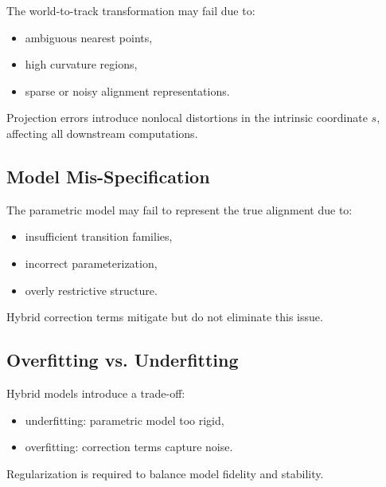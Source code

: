 The world-to-track transformation may fail due to:
\begin{itemize}
\item ambiguous nearest points,
\item high curvature regions,
\item sparse or noisy alignment representations.
\end{itemize}

\begin{proposition}
Projection errors introduce nonlocal distortions in the intrinsic
coordinate \(s\), affecting all downstream computations.
\end{proposition}


\subsection{Model Mis-Specification}

The parametric model may fail to represent the true alignment due to:
\begin{itemize}
\item insufficient transition families,
\item incorrect parameterization,
\item overly restrictive structure.
\end{itemize}

Hybrid correction terms mitigate but do not eliminate this issue.


\subsection{Overfitting vs. Underfitting}

Hybrid models introduce a trade-off:
\begin{itemize}
\item underfitting: parametric model too rigid,
\item overfitting: correction terms capture noise.
\end{itemize}

\begin{proposition}
Regularization is required to balance model fidelity and stability.
\end{proposition}


